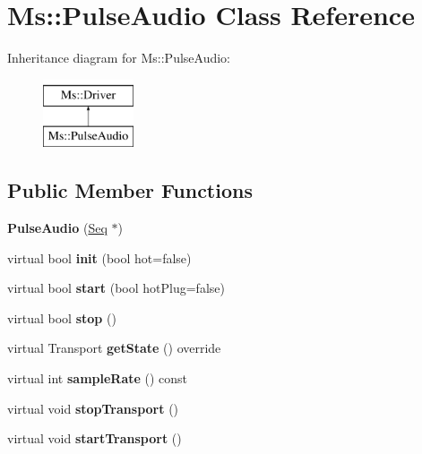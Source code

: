 \hypertarget{class_ms_1_1_pulse_audio}{}\section{Ms\+:\+:Pulse\+Audio Class Reference}
\label{class_ms_1_1_pulse_audio}
Inheritance diagram for Ms\+:\+:Pulse\+Audio\+:\begin{figure}[H]
\begin{center}
\leavevmode
\includegraphics[height=2.000000cm]{class_ms_1_1_pulse_audio}
\end{center}
\end{figure}
\subsection*{Public Member Functions}
\begin{DoxyCompactItemize}
\item 
\mbox{\label{class_ms_1_1_pulse_audio_a92dbf6515bdce931bedd166d11bcf07a}} 
{\bfseries Pulse\+Audio} (\hyperlink{class_ms_1_1_seq}{Seq} $\ast$)
\item 
\mbox{\label{class_ms_1_1_pulse_audio_a34d55615c2170fac05c3b385dba0227b}} 
virtual bool {\bfseries init} (bool hot=false)
\item 
\mbox{\label{class_ms_1_1_pulse_audio_a09e8bff62741e91e8599b3a75ea864c0}} 
virtual bool {\bfseries start} (bool hot\+Plug=false)
\item 
\mbox{\label{class_ms_1_1_pulse_audio_a1edd326f136013f0d2ecb0c2af2f7efa}} 
virtual bool {\bfseries stop} ()
\item 
\mbox{\label{class_ms_1_1_pulse_audio_a6b030a036944cb33057eef01405bb56c}} 
virtual Transport {\bfseries get\+State} () override
\item 
\mbox{\label{class_ms_1_1_pulse_audio_a57e78b8b2dc8c143fb2c88c6ec02b1c1}} 
virtual int {\bfseries sample\+Rate} () const
\item 
\mbox{\label{class_ms_1_1_pulse_audio_aa9b9f87c615954e5d8fa30ff4c722f48}} 
virtual void {\bfseries stop\+Transport} ()
\item 
\mbox{\label{class_ms_1_1_pulse_audio_a27ceba325a92657be1250f94dd062038}} 
virtual void {\bfseries start\+Transport} ()
\end{DoxyCompactItemize}
